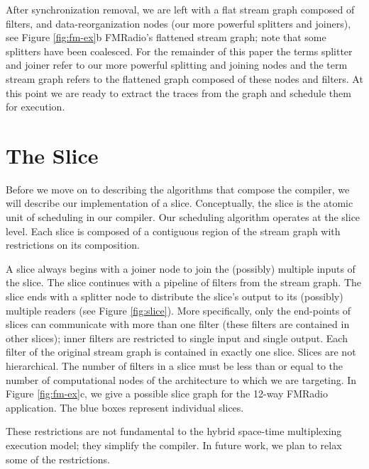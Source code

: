 After synchronization removal, we are left with a flat stream graph
composed of filters, and data-reorganization nodes (our more powerful
splitters and joiners), see Figure \ref{fig:fm-ex}b FMRadio's
flattened stream graph; note that some splitters have been
coalesced. For the remainder of this paper the terms splitter and
joiner refer to our more powerful splitting and joining nodes and the
term stream graph refers to the flattened graph composed of these
nodes and filters.  At this point we are ready to extract the traces
from the graph and schedule them for execution.



\section{The Slice}
Before we move on to describing the algorithms that compose the
compiler, we will describe our implementation of a
slice. Conceptually, the slice is the atomic unit of scheduling in our
compiler.  Our scheduling algorithm operates at the slice level.
Each slice is composed of a contiguous region of the stream
graph with restrictions on its composition. 

A slice always begins with a joiner node to join the (possibly)
multiple inputs of the slice.  The slice continues with a pipeline of
filters from the stream graph.  The slice ends with a splitter node to
distribute the slice's output to its (possibly) multiple readers (see
Figure \ref{fig:slice}).  More specifically, only the end-points of
slices can communicate with more than one filter (these filters are
contained in other slices); inner filters are restricted to single
input and single output.  Each filter of the original stream graph is
contained in exactly one slice.  Slices are not hierarchical.  The
number of filters in a slice must be less than or equal to the number
of computational nodes of the architecture to which we are targeting.
In Figure \ref{fig:fm-ex}c, we give a possible slice graph for the
12-way FMRadio application.  The blue boxes represent individual
slices.

These restrictions are not fundamental to the hybrid space-time
multiplexing execution model; they simplify the compiler.  In future
work, we plan to relax some of the restrictions.

